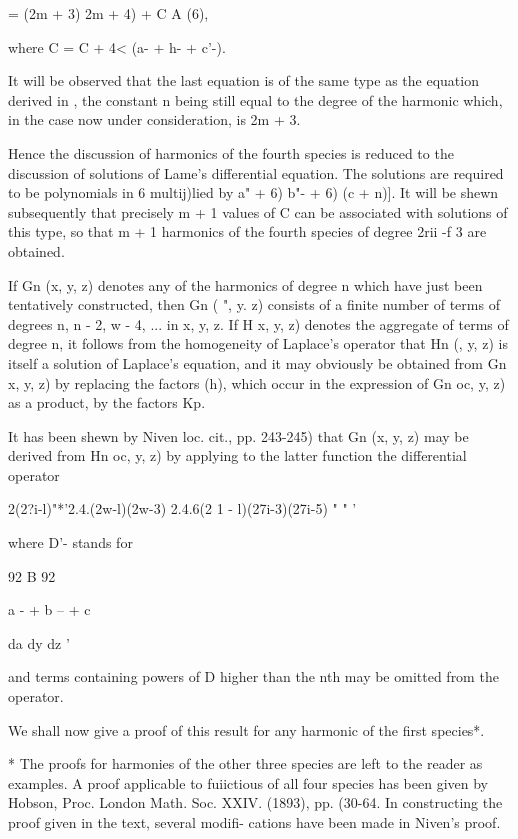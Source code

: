 {= (2m + 3) 2m + 4) + C A (6),

where C = C + 4< (a- + h- + c'-).

It will be observed that the last equation is of the same type as the
equation derived in , the constant n being still equal to the
degree of the harmonic which, in the case now under consideration, is
2m + 3.

Hence the discussion of harmonics of the fourth species is reduced to
the discussion of solutions of Lame's differential equation. The
solutions are required to be polynomials in 6 multij)lied by \/ a" +
6) b"- + 6) (c + n)]. It will be shewn subsequently that precisely m +
1 values of C can be associated with solutions of this type, so that m
+ 1 harmonics of the fourth species of degree 2rii -f 3 are obtained.


If Gn (x, y, z) denotes any of the harmonics of degree n which have
just been tentatively constructed, then Gn ( ", y. z) consists of a
finite number of terms of degrees n, n - 2, w - 4, ... in x, y, z. If
H x, y, z) denotes the aggregate of terms of degree n, it follows from
the homogeneity of Laplace's operator that Hn (, y, z) is itself a
solution of Laplace's equation, and it may obviously be obtained from
Gn x, y, z) by replacing the factors (h), which occur in the
expression of Gn oc, y, z) as a product, by the factors Kp.

It has been shewn by Niven loc. cit., pp. 243-245) that Gn (x, y, z)
may be derived from Hn oc, y, z) by applying to the latter function
the differential operator

2(2?i-l)"*'2.4.(2w-l)(2w-3) 2.4.6(2 1 - l)(27i-3)(27i-5) " " '

where D'- stands for

92 B 92

a - + b -- + c ~

da dy dz '

and terms containing powers of D higher than the nth may be omitted
from the operator.

We shall now give a proof of this result for any harmonic of the first
species*.

* The proofs for harmonies of the other three species are left to the
reader as examples. A proof applicable to fuiictious of all four
species has been given by Hobson, Proc. London Math. Soc. XXIV.
(1893), pp. (30-64. In constructing the proof given in the text,
several modifi- cations have been made in Niven's proof.

}
